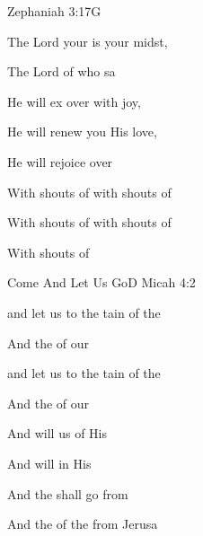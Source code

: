 \documentclass[12pt]{book}
\newcommand{\RevDate}{\today}
\newcommand{\NotCCLIed}{\relax}
\begin{document}
\begin{song}{Zephaniah 3:17}{G}
  {}
  {}
  {}
  {\NotCCLIed}

  \renewcommand{\RevDate}{February~11,~1993}

  \begin{SBOpGroup}
     The Lord your  is  your midst,
    
     The Lord of  who sa
    
     He will ex over  with joy,
    
     He will renew you  His love,
    
     He will rejoice over 
    
    With shouts of    with shouts of   
    
    With shouts of   with shouts of  
    
    With shouts of 
  \end{SBOpGroup}
\end{song}


\begin{song}{Come And Let Us Go}{D}
  {}
  {}
  {Micah 4:2}
  {\NotCCLIed}

  \renewcommand{\RevDate}{February~11,~1993}

  \begin{SBOpGroup}
     and let us  to the tain of the 
    
    And  the  of our 
    
     and let us  to the tain of the 
    
    And  the  of our 
    
    And  will  us of His  
    
    And  will  in His  
    
    And the  shall go  from 
    
    And the  of the  from Jerusa
  \end{SBOpGroup}
\end{song}
\end{document}
